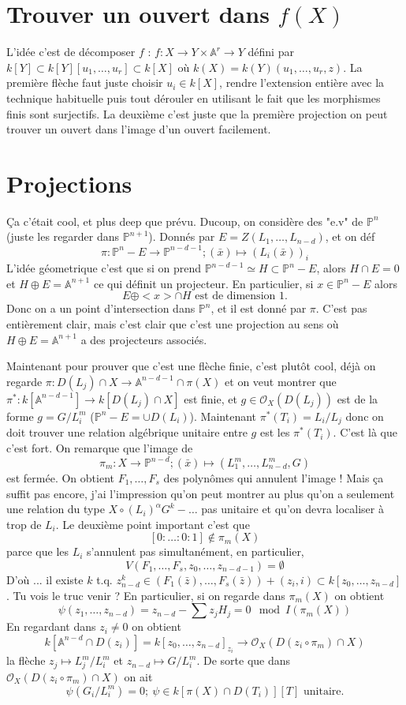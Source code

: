 \documentclass[a4paper,12pt]{book}
\newcommand{\A}{\mathbb{A}}
\newcommand{\Or}{\mathcal{O}}
\renewcommand{\Pr}{\mathbb{P}}
\theoremstyle{plain}
\theoremstyle{definition}
\theoremstyle{remark}
\begin{document}
\section{Trouver un ouvert dans $f(X)$}
L'idée c'est de décomposer $f$ : $f\colon X\to Y\times \A^r\to Y$ 
défini par $k[Y]\subset k[Y][u_1,\ldots, u_r]\subset k[X]$ où 
$k(X)=k(Y)(u_1,\ldots, u_r, z)$. La première flèche faut juste 
choisir $u_i\in k[X]$, rendre l'extension entière avec la 
technique habituelle puis tout dérouler en utilisant le fait 
que les morphismes finis sont surjectifs. La deuxième c'est
juste que la première projection on peut trouver un ouvert dans
l'image d'un ouvert facilement.

\section{Projections}
Ça c'était cool, et plus deep que prévu. Ducoup, 
on considère des "e.v" de $\Pr^n$ (juste les regarder
dans $\Pr^{n+1}$). Donnés par $E=Z(L_1,\ldots,L_{n-d})$,
et on déf 
\[\pi\colon \Pr^n-E\to \Pr^{n-d-1};(\bar x)\mapsto (L_i(\bar x))_i\]
L'idée géometrique c'est que si on prend 
$\Pr^{n-d-1}\simeq H\subset \Pr^n-E$, alors $H\cap E=0$ et $H\oplus E=
\A^{n+1}$ ce qui définit un projecteur. En particulier, si
$x\in \Pr^{n}-E$ alors 
\[E\oplus <x>\cap H\textrm{ est de dimension }1.\]
Donc on a un point d'intersection dans $\Pr^{n}$, et il est donné par 
$\pi$. C'est pas entièrement clair, mais c'est clair que c'est une 
projection au sens où $H\oplus E=\A^{n+1}$ a des projecteurs associés.

Maintenant pour prouver que c'est une flèche finie, c'est plutôt cool,
déjà on regarde $\pi\colon D(L_j)\cap X\to \A^{n-d-1}\cap \pi(X)$ et 
on veut montrer que $\pi^*\colon k[\A^{n-d-1}]\to k[D(L_j)\cap X]$
est finie, et $g\in \Or_X(D(L_j))$ est de la forme $g=G/L_i^m$
($\Pr^n-E=\cup D(L_i)$). Maintenant $\pi^*(T_i)=L_i/L_j$ donc on doit 
trouver une relation algébrique unitaire entre $g$ est les $\pi^*(T_i)$.
C'est là que c'est fort. On remarque que l'image de
\[\pi_m\colon X\to \Pr^{n-d};(\bar x)\mapsto (L_1^m,\ldots,
L_{n-d}^m,G)\]
est fermée. On obtient $F_1,\ldots, F_s$ des polynômes qui annulent 
l'image ! Mais ça suffit pas encore, j'ai l'impression qu'on peut
montrer au plus qu'on a seulement une relation du type 
$X\circ(L_i)^{\alpha}G^k -\ldots$ pas unitaire et qu'on devra localiser 
à trop de $L_i$. Le deuxième point important c'est que
\[[0:\ldots:0:1]\notin \pi_m(X)\]
parce que les $L_i$ s'annulent pas simultanément, en particulier, 
\[V(F_1,\ldots,F_s, z_0,\ldots, z_{n-d-1})=\emptyset\]
D'où ... il existe $k$ t.q. 
$z_{n-d}^k\in (F_1(\bar z),\ldots, F_s(\bar z))+(z_i, i) \subset 
k[z_0,\ldots, z_{n-d}]$. Tu vois le truc venir ? En particulier, 
si on regarde dans $\pi_m(X)$ on obtient 
\[\psi(z_1,\ldots,z_{n-d})=z_{n-d}-\sum z_j H_j = 0\mod I(\pi_m(X))\]
En regardant dans $z_i\ne 0$ on obtient 
\[k[\A^{n-d}\cap D(z_i)]=k[z_0,\ldots, z_{n-d}]_{z_i}\to 
\Or_X(D(z_i\circ \pi_m)\cap X)\]
la flèche $z_j\mapsto L_j^m/L_i^m$ et $z_{n-d}\mapsto G/L_i^m$. De sorte
que dans $\Or_X(D(z_i\circ \pi_m)\cap X)$ on ait 
\[\psi(G_i/L_i^m)=0;
    ~\psi\in k[\pi(X)\cap D(T_{i})][T]\textrm{ unitaire.}
\]
\end{document}
